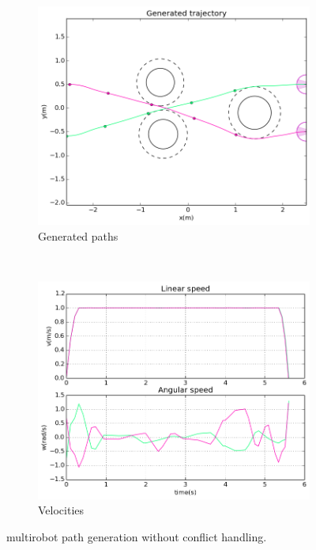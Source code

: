 \begin{figure}[!h]
        \centering
        ~ %
        \begin{subfigure}[b]{0.48\textwidth}
                \includegraphics[width=\textwidth]{./images/pwc.png}
                \caption{Generated paths}\label{fig:pwc}
        \end{subfigure}
        ~ %
        \begin{subfigure}[b]{0.48\textwidth}
                \includegraphics[width=\textwidth]{./images/vwc.png}
                \caption{Velocities}\label{fig:vwc}
        \end{subfigure}
        \caption{multirobot path generation without conflict handling.}\label{fig:wc}
\end{figure}

